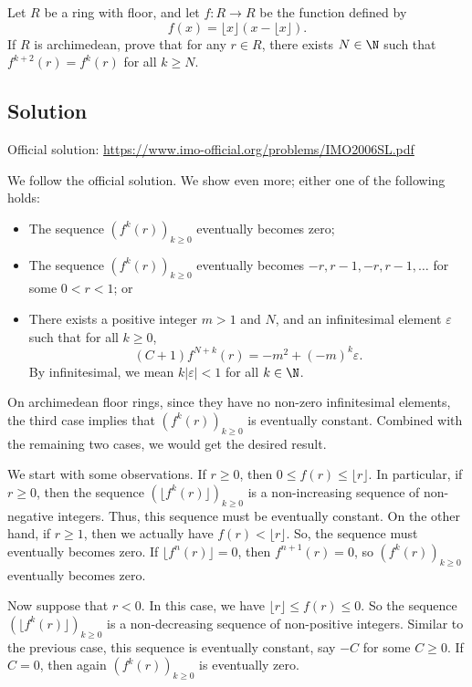 Let $R$ be a ring with floor, and let $f : R \to R$ be the function defined by
\[ f(x) = \lfloor x \rfloor (x - \lfloor x \rfloor). \]
If $R$ is archimedean, prove that for any $r \in R$, there exists $N \in \N$ such that $f^{k + 2}(r) = f^k(r)$ for all $k \geq N$.





\subsection*{Solution}

Official solution: \url{https://www.imo-official.org/problems/IMO2006SL.pdf}

We follow the official solution.
We show even more; either one of the following holds:
\begin{itemize}
    \item   The sequence $(f^k(r))_{k \geq 0}$ eventually becomes zero;
    \item   The sequence $(f^k(r))_{k \geq 0}$ eventually becomes $-r, r - 1, -r, r - 1, \ldots$ for some $0 < r < 1$; or
    \item   There exists a positive integer $m > 1$ and $N$, and an infinitesimal element $\varepsilon$ such that for all $k \geq 0$,
            \[ (C + 1) f^{N + k}(r) = -m^2 + (-m)^k \varepsilon. \]
            By infinitesimal, we mean $k |\varepsilon| < 1$ for all $k \in \N$.
\end{itemize}

On archimedean floor rings, since they have no non-zero infinitesimal elements, the third case implies that $(f^k(r))_{k \geq 0}$ is eventually constant.
Combined with the remaining two cases, we would get the desired result.

We start with some observations.
If $r \geq 0$, then $0 \leq f(r) \leq \lfloor r \rfloor$.
In particular, if $r \geq 0$, then the sequence $(\lfloor f^k(r) \rfloor)_{k \geq 0}$ is a non-increasing sequence of non-negative integers.
Thus, this sequence must be eventually constant.
On the other hand, if $r \geq 1$, then we actually have $f(r) < \lfloor r \rfloor$.
So, the sequence must eventually becomes zero.
If $\lfloor f^n(r) \rfloor = 0$, then $f^{n + 1}(r) = 0$, so $(f^k(r))_{k \geq 0}$ eventually becomes zero.

Now suppose that $r < 0$.
In this case, we have $\lfloor r \rfloor \leq f(r) \leq 0$.
So the sequence $(\lfloor f^k(r) \rfloor)_{k \geq 0}$ is a non-decreasing sequence of non-positive integers.
Similar to the previous case, this sequence is eventually constant, say $-C$ for some $C \geq 0$.
If $C = 0$, then again $(f^k(r))_{k \geq 0}$ is eventually zero.

